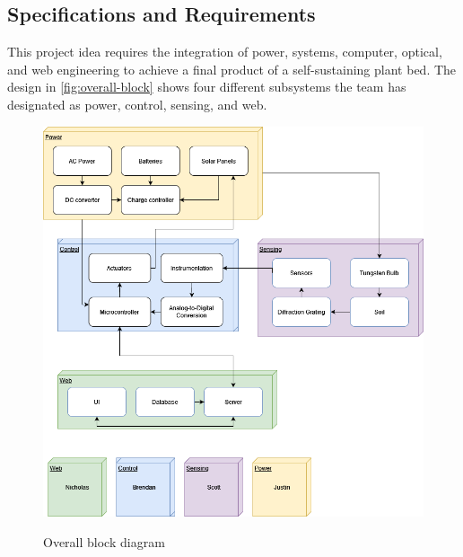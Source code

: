 \subsection{Specifications and Requirements}\label{sec:specs-and-reqs}
This project idea requires the integration of power, systems, computer, optical, and web engineering to achieve a final product of a self-sustaining plant bed. The design in \autoref{fig:overall-block} shows four different subsystems the team has designated as power, control, sensing, and web.
\begin{figure}[H]
    \caption{Overall block diagram}
    \centering
    \includegraphics[width=\textwidth]{images/Overall Block Diagram.png}
    \label{fig:overall-block}
\end{figure}
